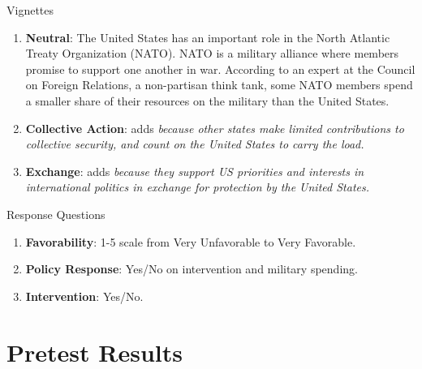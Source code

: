 \documentclass[12pt]{beamer}
\begin{document}
\begin{frame}{Vignettes}


\begin{enumerate}

\item \textbf{Neutral}: The United States has an important role in the North Atlantic Treaty Organization (NATO). NATO is a military alliance where members promise to support one another in war. According to an expert at the Council on Foreign Relations, a non-partisan think tank, some NATO members spend a smaller share of their resources on the military than the United States. 
\pause
\item \textbf{Collective Action}: adds \textit{because other states make limited contributions to collective security, and count on the United States to carry the load.} 
\pause
\item \textbf{Exchange}: adds \textit{because they support US priorities and interests in international politics in exchange for protection by the United States.}
 
\end{enumerate} 

\end{frame} 



\begin{frame}{Response Questions}


\begin{enumerate}

\item \textbf{Favorability}: 1-5 scale from Very Unfavorable to Very Favorable.  
\pause 
\item \textbf{Policy Response}: Yes/No on intervention and military spending. 
\pause 
\item \textbf{Intervention}: Yes/No. 
 
\end{enumerate} 

\end{frame} 




\section{Pretest Results} 

\end{document}
